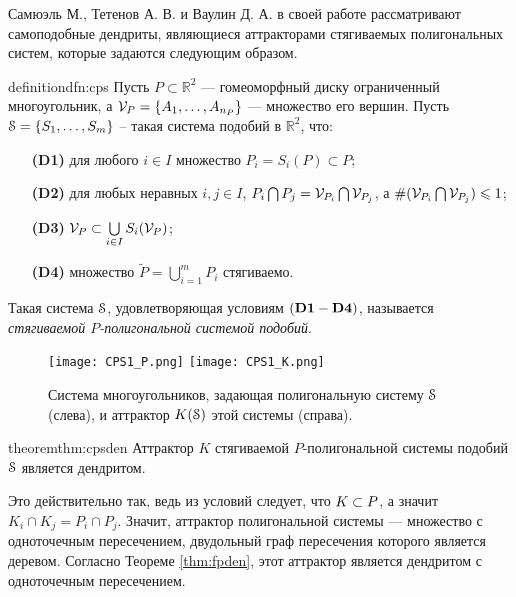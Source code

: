 Самюэль М., Тетенов А. В. и Ваулин Д. А. в своей работе \cite{STV2017} рассматривают самоподобные дендриты, являющиеся аттракторами стягиваемых полигональных систем, которые задаются следующим образом.


\begin{restatethis}{definition}{dfn:cps} \label{dfn:cps}
Пусть $P\subset\mathbb{R}^2$ ---  гомеоморфный диску ограниченный многоугольник, а $ {\mathcal V}_P= \{A_1, \ldots, A_{n_P}\}$ --- множество его вершин.
Пусть  ${\EuScript S} = \{S_1, \ldots, S_m\}$ -- такая система подобий в ${\mathbb{R}}^2$, что:
\begin{itemize}[nolistsep]
\item[{\bf (D1)}] для любого $i \in I$ множество $P_i = S_i (P) \subset P$; 
\item[{\bf (D2)}] для любых неравных $i, j \in I$,  $P_i \bigcap P_j =  {\mathcal V}_{P_i} \bigcap  {\mathcal V}_{P_j}$, а $\#({\mathcal V}_{P_i} \bigcap  {\mathcal V}_{P_j})\leqslant 1$;  
\item[{\bf (D3)}] ${\mathcal V}_P \subset \bigcup \limits_{i \in I} S_i ({\mathcal V}_P)$;
\item[{\bf (D4)}] множество $\widetilde P = \bigcup \limits_{i = 1} ^m P_i$ стягиваемо.
\end{itemize} 
Такая система  ${\EuScript S}$, удовлетворяющая условиям $\bf (D1 - D4)$, называется  {\em стягиваемой $P$-полигональной системой подобий}.
\end{restatethis}

\begin{figure}[H]
\texttt{[image: CPS1\_P.png]}
\hfill
\texttt{[image: CPS1\_K.png]}
\caption{Система многоугольников, задающая полигональную систему ${\EuScript S}$ (слева), и аттрактор $K({\EuScript S})$ этой системы (справа).}
\end{figure}

\begin{restatethis}{theorem}{thm:cpsden} %
Аттрактор $K$  стягиваемой  $P$-полигональной системы подобий ${\EuScript S}$ является дендритом.
\end{restatethis}

Это действительно так, ведь из условий следует, что $K\subset P$, а значит $K_i\cap K_j=P_i\cap P_j$.
Значит, аттрактор полигональной системы --- множество с одноточечным пересечением, двудольный граф пересечения которого является деревом.
Согласно Теореме \ref{thm:fpden}, этот аттрактор является дендритом с одноточечным пересечением.\\

